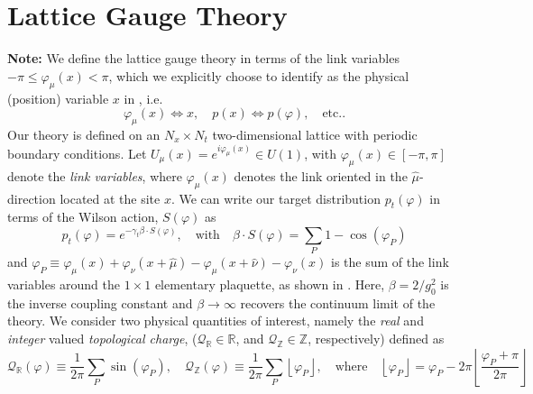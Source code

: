 \documentclass{article} %
\begin{document}
{\section{\label{sec:lattice_gauge_theory}Lattice Gauge Theory}
%
\textbf{Note:} We define the lattice gauge theory in terms of the link variables \(-\pi \leq \varphi_{\mu}(x) < \pi\),
which we explicitly choose to identify as the physical (position) variable \(x\) in , i.e.\ 
\begin{equation}
   \varphi_{\mu}(x)\Longleftrightarrow x, \quad p(x)\Longleftrightarrow p(\varphi),\quad \text{etc.}.
\end{equation}
%
Our theory is defined on an \(N_{x}\times N_{t}\) two-dimensional lattice with periodic boundary conditions.
%
Let \(U_{\mu}(x) = e^{i\varphi_{\mu}(x)} \in U(1)\), with \(\varphi_{\mu}(x) \in [-\pi,\pi]\) denote the \emph{link
variables}, where \(\varphi_{\mu}(x)\) denotes the link oriented in the \(\hat{\mu}\)-direction located at the site
\(x\).
%
%
We can write our target distribution \(p_{t}(\varphi)\) in terms of the Wilson action, \(S(\varphi)\) as
%
\begin{equation}
   p_{t}(\varphi) = e^{-\gamma_{t}\beta\cdot S(\varphi)},\quad\text{with}\quad \beta\cdot S(\varphi) = \sum_{P}1 - \cos(\varphi_{P})
\end{equation}
%
and \(\varphi_{P} \equiv \varphi_{\mu}(x) + \varphi_{\nu}(x+\hat{\mu}) - \varphi_{\mu}(x+\hat{\nu})
-\varphi_{\nu}(x)\) is the sum of the link variables around the \(1\times1\) elementary plaquette, as shown in
\Figref{fig:plaquette}.
%
Here, \(\beta = 2 / g_{0}^{2}\) is the inverse coupling constant and \(\beta\rightarrow\infty\) recovers the continuum
limit of the theory. 
%
We consider two physical quantities of interest, namely the \emph{real} and \emph{integer} valued \emph{topological
charge}, (\(\mathcal{Q}_{\mathbb{R}} \in \mathbb{R}\), and \(\mathcal{Q}_{\mathbb{Z}}\in\mathbb{Z}\), respectively)
defined as
%
\begin{equation*}
   \mathcal{Q}_{\mathbb{R}}(\varphi) 
   \equiv \frac{1}{2\pi}\sum_{P}\sin(\varphi_{P}),\quad%
      \mathcal{Q}_{\mathbb{Z}}(\varphi) \equiv \frac{1}{2\pi}\sum_{P}\left\lfloor\varphi_{P}\right\rfloor,
   \quad\text{where}\quad \left\lfloor\varphi_{P}\right\rfloor = \varphi_{P} -
   2\pi\left\lfloor\frac{\varphi_{P}+\pi}{2\pi}\right\rfloor

\end{equation*}}
\end{document}

